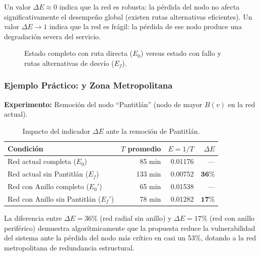 Un valor $\Delta E \approx 0$ indica que la red es robusta: la pérdida del nodo no
afecta significativamente el desempeño global (existen rutas alternativas eficientes).
Un valor $\Delta E \to 1$ indica que la red es frágil: la pérdida de ese nodo produce
una degradación severa del servicio.


\begin{figure}[H]
    \centering
    \caption[Diagrama del indicador de Robustez Geométrica $\Delta E$]{Estado
    completo con ruta directa ($E_0$) versus estado con fallo y rutas
    alternativas de desvío ($E_f$).}
    \label{fig:indicador-deltaE}
\end{figure}


\subsubsection{Ejemplo Práctico: \cdmx{} y Zona Metropolitana}

\textbf{Experimento:} Remoción del nodo ``Pantitlán'' (nodo de mayor $B(v)$ en
la red actual).

\begin{table}[H]
    \centering
    \caption{Impacto del indicador $\Delta E$ ante la remoción de Pantitlán.}
    \label{tab:robustez}
    \begin{tabularx}{\textwidth}{X r r r}
        \toprule
        \textbf{Condición} & \textbf{$T$ promedio} &
        \textbf{$E = 1/T$} & \textbf{$\Delta E$} \\
        \midrule
        Red actual completa ($E_0$)          & 85 min & 0.01176 & --- \\
        Red actual sin Pantitlán ($E_f$)     & 133 min & 0.00752 & $\mathbf{36\%}$ \\
        Red con Anillo completo ($E_0'$)     & 65 min & 0.01538 & --- \\
        Red con Anillo sin Pantitlán ($E_f'$) & 78 min & 0.01282 & $\mathbf{17\%}$ \\
        \bottomrule
    \end{tabularx}
\end{table}

La diferencia entre $\Delta E = 36\%$ (red radial sin anillo) y $\Delta E = 17\%$
(red con anillo periférico) demuestra algorítmicamente que la propuesta reduce la
vulnerabilidad del sistema ante la pérdida del nodo más crítico en casi un 53\%,
dotando a la red metropolitana de redundancia estructural.

